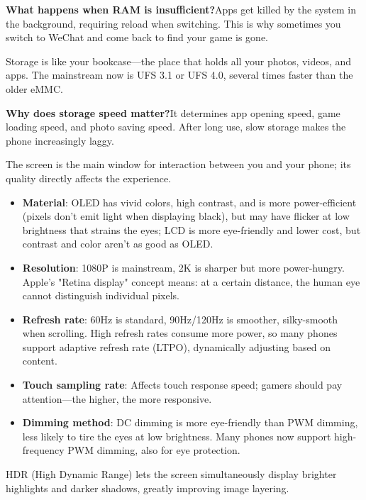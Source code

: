 \textbf{What happens when RAM is insufficient?}Apps get killed by the system in the background, requiring reload when switching. This is why sometimes you switch to WeChat and come back to find your game is gone.


Storage is like your bookcase—the place that holds all your photos, videos, and apps. The mainstream now is UFS 3.1 or UFS 4.0, several times faster than the older eMMC.

\textbf{Why does storage speed matter?}It determines app opening speed, game loading speed, and photo saving speed. After long use, slow storage makes the phone increasingly laggy.


The screen is the main window for interaction between you and your phone; its quality directly affects the experience.

\begin{itemize}
  \item \textbf{Material}: OLED has vivid colors, high contrast, and is more power-efficient (pixels don't emit light when displaying black), but may have flicker at low brightness that strains the eyes; LCD is more eye-friendly and lower cost, but contrast and color aren't as good as OLED.
  \item \textbf{Resolution}: 1080P is mainstream, 2K is sharper but more power-hungry. Apple's "Retina display" concept means: at a certain distance, the human eye cannot distinguish individual pixels.
  \item \textbf{Refresh rate}: 60Hz is standard, 90Hz/120Hz is smoother, silky-smooth when scrolling. High refresh rates consume more power, so many phones support adaptive refresh rate (LTPO), dynamically adjusting based on content.
  \item \textbf{Touch sampling rate}: Affects touch response speed; gamers should pay attention—the higher, the more responsive.
  \item \textbf{Dimming method}: DC dimming is more eye-friendly than PWM dimming, less likely to tire the eyes at low brightness. Many phones now support high-frequency PWM dimming, also for eye protection.
\end{itemize}


HDR (High Dynamic Range) lets the screen simultaneously display brighter highlights and darker shadows, greatly improving image layering.

